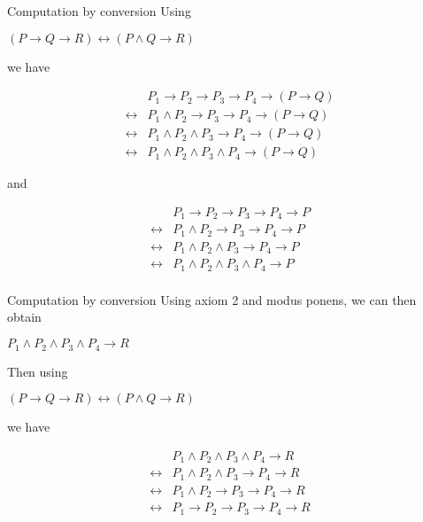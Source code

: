 \documentclass[presentation]{beamer}
\begin{document}
\begin{frame}[label={sec:orgheadline23}]{Computation by conversion}
\small
  Using

\begin{center}
\((P \rightarrow Q \rightarrow R) \leftrightarrow (P \wedge Q \rightarrow R)\)
\end{center}

we have

\begin{align*}
                  &P_1 \rightarrow P_2 \rightarrow P_3 \rightarrow P_4 \rightarrow (P \rightarrow Q)\\
  \leftrightarrow &P_1 \wedge P_2 \rightarrow P_3 \rightarrow P_4 \rightarrow (P \rightarrow Q)\\
  \leftrightarrow &P_1 \wedge P_2 \wedge P_3 \rightarrow P_4 \rightarrow (P \rightarrow Q)\\
  \leftrightarrow &P_1 \wedge P_2 \wedge P_3 \wedge P_4 \rightarrow (P \rightarrow Q)
\end{align*}

and

\begin{align*}
                  &P_1 \rightarrow P_2 \rightarrow P_3 \rightarrow P_4 \rightarrow P\\
  \leftrightarrow &P_1 \wedge P_2 \rightarrow P_3 \rightarrow P_4 \rightarrow P\\
  \leftrightarrow &P_1 \wedge P_2 \wedge P_3 \rightarrow P_4 \rightarrow P\\
  \leftrightarrow &P_1 \wedge P_2 \wedge P_3 \wedge P_4 \rightarrow P\\
\end{align*}
\end{frame}

\begin{frame}[label={sec:orgheadline24}]{Computation by conversion}
Using axiom 2 and modus ponens, we can then obtain

\begin{center}
\(P_1 \wedge P_2 \wedge P_3 \wedge P_4 \rightarrow R\)
\end{center}

Then using 

\begin{center}
\((P \rightarrow Q \rightarrow R) \leftrightarrow (P \wedge Q \rightarrow R)\)
\end{center}

we have

\begin{align*}
                  &P_1 \wedge P_2 \wedge P_3 \wedge P_4 \rightarrow R\\
  \leftrightarrow &P_1 \wedge P_2 \wedge P_3 \rightarrow P_4 \rightarrow R\\
  \leftrightarrow &P_1 \wedge P_2 \rightarrow P_3 \rightarrow P_4 \rightarrow R\\
  \leftrightarrow &P_1 \rightarrow P_2 \rightarrow P_3 \rightarrow P_4 \rightarrow R
\end{align*}
\end{frame}
\end{document}
